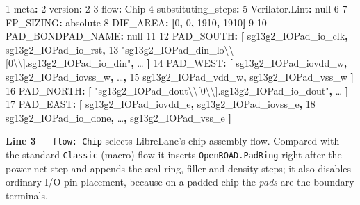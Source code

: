 \documentclass[
  11pt,
  a4paper,
]{article}
\newenvironment{Shaded}{}{}
\newcommand{\AttributeTok}[1]{\textcolor[rgb]{0.49,0.56,0.16}{#1}}
\newcommand{\CharTok}[1]{\textcolor[rgb]{0.25,0.44,0.63}{#1}}
\newcommand{\DecValTok}[1]{\textcolor[rgb]{0.25,0.63,0.44}{#1}}
\newcommand{\FunctionTok}[1]{\textcolor[rgb]{0.02,0.16,0.49}{#1}}
\newcommand{\KeywordTok}[1]{\textcolor[rgb]{0.00,0.44,0.13}{\textbf{#1}}}
\newcommand{\SpecialCharTok}[1]{\textcolor[rgb]{0.25,0.44,0.63}{#1}}
\newcommand{\StringTok}[1]{\textcolor[rgb]{0.25,0.44,0.63}{#1}}
\begin{document}
\begin{Shaded}
\begin{Highlighting}[]
\AttributeTok{ }\FunctionTok{1  meta}\KeywordTok{:}
\AttributeTok{ }\FunctionTok{2    version}\KeywordTok{:}\AttributeTok{ }\DecValTok{2}
\AttributeTok{ }\FunctionTok{3    flow}\KeywordTok{:}\AttributeTok{ Chip}
\AttributeTok{ }\FunctionTok{4    substituting\_steps}\KeywordTok{:}
\AttributeTok{ }\FunctionTok{5      Verilator.Lint}\KeywordTok{:}\AttributeTok{ }\CharTok{null}
\AttributeTok{ }\DecValTok{6}
\AttributeTok{ }\FunctionTok{7  FP\_SIZING}\KeywordTok{:}\AttributeTok{ absolute}
\AttributeTok{ }\FunctionTok{8  DIE\_AREA}\KeywordTok{:}\AttributeTok{ }\KeywordTok{[}\DecValTok{0}\KeywordTok{,}\AttributeTok{ }\DecValTok{0}\KeywordTok{,}\AttributeTok{ }\DecValTok{1910}\KeywordTok{,}\AttributeTok{ }\DecValTok{1910}\KeywordTok{]}
\AttributeTok{ }\DecValTok{9}
\FunctionTok{10  PAD\_BONDPAD\_NAME}\KeywordTok{:}\AttributeTok{ }\CharTok{null}
\DecValTok{11}
\FunctionTok{12  PAD\_SOUTH}\KeywordTok{:}\AttributeTok{ }\KeywordTok{[}\AttributeTok{ sg13g2\_IOPad\_io\_clk}\KeywordTok{,}\AttributeTok{ sg13g2\_IOPad\_io\_rst}\KeywordTok{,}
\AttributeTok{13             }\StringTok{"sg13g2\_IOPad\_din\_lo}\SpecialCharTok{\textbackslash{}\textbackslash{}}\StringTok{[0}\SpecialCharTok{\textbackslash{}\textbackslash{}}\StringTok{].sg13g2\_IOPad\_io\_din"}\KeywordTok{,}\AttributeTok{ … }\KeywordTok{]}
\FunctionTok{14  PAD\_WEST}\KeywordTok{:}\AttributeTok{  }\KeywordTok{[}\AttributeTok{ sg13g2\_IOPad\_iovdd\_w}\KeywordTok{,}\AttributeTok{ sg13g2\_IOPad\_iovss\_w}\KeywordTok{,}\AttributeTok{ …}\KeywordTok{,}
\AttributeTok{15               sg13g2\_IOPad\_vdd\_w}\KeywordTok{,}\AttributeTok{ sg13g2\_IOPad\_vss\_w }\KeywordTok{]}
\FunctionTok{16  PAD\_NORTH}\KeywordTok{:}\AttributeTok{ }\KeywordTok{[}\AttributeTok{ }\StringTok{"sg13g2\_IOPad\_dout}\SpecialCharTok{\textbackslash{}\textbackslash{}}\StringTok{[0}\SpecialCharTok{\textbackslash{}\textbackslash{}}\StringTok{].sg13g2\_IOPad\_io\_dout"}\KeywordTok{,}\AttributeTok{ … }\KeywordTok{]}
\FunctionTok{17  PAD\_EAST}\KeywordTok{:}\AttributeTok{  }\KeywordTok{[}\AttributeTok{ sg13g2\_IOPad\_iovdd\_e}\KeywordTok{,}\AttributeTok{ sg13g2\_IOPad\_iovss\_e}\KeywordTok{,}
\AttributeTok{18               sg13g2\_IOPad\_io\_done}\KeywordTok{,}\AttributeTok{ …}\KeywordTok{,}\AttributeTok{ sg13g2\_IOPad\_vss\_e }\KeywordTok{]}
\end{Highlighting}
\end{Shaded}

\textbf{Line 3} --- \texttt{flow:\ Chip} selects LibreLane's
chip-assembly flow. Compared with the standard \texttt{Classic} (macro)
flow it inserts \texttt{OpenROAD.PadRing} right after the power-net step
and appends the seal-ring, filler and density steps; it also disables
ordinary I/O-pin placement, because on a padded chip the \emph{pads} are
the boundary terminals.
\end{document}
